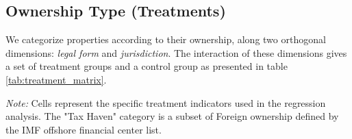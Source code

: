 \documentclass[12pt]{article}
\begin{document}
\subsection{Ownership Type (Treatments)}
We categorize properties according to their ownership, along two orthogonal dimensions: \textit{legal form} and \textit{jurisdiction}. The interaction of these dimensions gives a set of treatment groups and a control group as presented in table \ref{tab:treatment_matrix}.
\begin{table}[h]
\centering
\caption{Treatment Matrix}
\label{tab:treatment_matrix}
\begin{flushleft}
\footnotesize \textit{Note:} Cells represent the specific treatment indicators used in the regression analysis. The "Tax Haven" category is a subset of Foreign ownership defined by the IMF offshore financial center list.
\end{flushleft}
\end{table}
\end{document}
